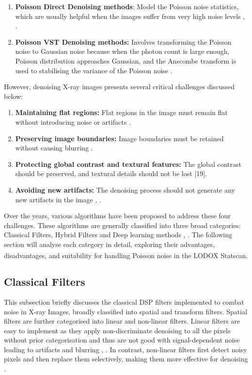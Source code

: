 \begin{enumerate}
    \item \textbf{Poisson Direct Denoising methods}: Model the Poisson noise statistics, which are usually helpful when the images suffer from very high noise levels \cite{kirti_poisson_2017}, \cite{kipele_poisson_2023}.
    \item \textbf{Poisson \gls{VST} Denoising methods:} Involves transforming the Poisson noise to Gaussian noise because when the photon count is large enough, Poisson distribution approaches Gaussian, and the \gls{Anscombe transform} is used to stabilising the variance of the Poisson noise \cite{kipele_poisson_2023}.
\end{enumerate}

However, denoising X-ray images presents several critical challenges discussed below:

\begin{enumerate}
    \item \textbf{Maintaining flat regions:} Flat regions in the image must remain flat without introducing noise or artifacts \cite{juneja_denoising_2024}.
    \item \textbf{Preserving image boundaries:} Image boundaries must be retained without causing blurring \cite{juneja_denoising_2024}.
    \item \textbf{Protecting global contrast and textural features:} The global contrast should be preserved, and textural details should not be lost [19].
    \item \textbf{Avoiding new artifacts:} The denoising process should not generate any new artifacts in the image \cite{juneja_denoising_2024}, \cite{thanh_review_2019}.
\end{enumerate}
 
 
Over the years, various algorithms have been proposed to address these four challenges. These algorithms are generally classified into three broad categories: Classical Filters, Hybrid Filters and Deep learning methods \cite{juneja_denoising_2024}, \cite{kirti_poisson_2017}. The following section will analyse each category in detail, exploring their advantages, disadvantages, and suitability for handling Poisson noise in the LODOX\textsuperscript{\textregistered} Statscan\textsuperscript{\textregistered}.

\subsection{Classical Filters}
This subsection briefly discusses the classical \gls{DSP} filters implemented to combat noise in X-ray Images, broadly classified into spatial and transform filters.  Spatial filters are further categorised into linear and non-linear filters. Linear filters are easy to implement as they apply non-discriminate denoising to all the pixels without prior categorisation \cite{khan_new_2016} and thus are not good with signal-dependent noise leading to artifacts and blurring \cite{juneja_denoising_2024}, \cite{mandic_denoising_2018}. In contrast, non-linear filters first detect noisy pixels and then replace them selectively, making them more effective for denoising \cite{khan_new_2016}.

